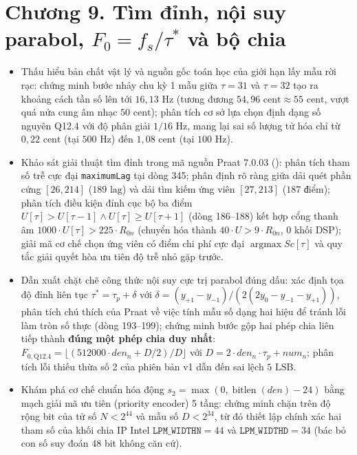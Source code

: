 \providecommand{\todo}[1]{\textcolor{red}{\textbf{[TODO: #1]}}}
\clearpage
{}
\section*{Chương 9. Tìm đỉnh, nội suy parabol, $F_0 = f_s/\tau^*$ và bộ chia}

\begin{learningobj}
\begin{itemize}[leftmargin=1.5em, itemsep=2pt]
    \item Thấu hiểu bản chất vật lý và nguồn gốc toán học của giới hạn lấy mẫu rời rạc: chứng minh bước nhảy chu kỳ 1 mẫu giữa $\tau = 31$ và $\tau = 32$ tạo ra khoảng cách tần số lên tới $16{,}13\text{ Hz}$ (tương đương $54{,}96\text{ cent} \approx 55\text{ cent}$, vượt quá nửa cung âm nhạc $50\text{ cent}$); phân tích cơ sở lựa chọn định dạng số nguyên Q12.4 với độ phân giải $1/16\text{ Hz}$, mang lại sai số lượng tử hóa chỉ từ $0{,}22\text{ cent}$ (tại $500\text{ Hz}$) đến $1{,}08\text{ cent}$ (tại $100\text{ Hz}$).
    \item Khảo sát giải thuật tìm đỉnh trong mã nguồn Praat 7.0.03 (): phân tích tham số trễ cực đại \texttt{maximumLag} tại dòng 345; phân định rõ ràng giữa dải quét phần cứng $[26, 214]$ ($189\text{ lag}$) và dải tìm kiếm ứng viên $[27, 213]$ ($187\text{ điểm}$); phân tích điều kiện đỉnh cục bộ ba điểm $U[\tau] > U[\tau-1] \land U[\tau] \ge U[\tau+1]$ (dòng 186--188) kết hợp cổng thanh âm $1000 \cdot U[\tau] > 225 \cdot R_{0n}$ (chuyển hóa thành $40 \cdot U > 9 \cdot R_{0n}$, 0 khối DSP); giải mã cơ chế chọn ứng viên có điểm chi phí cực đại $\operatorname{argmax} Sc[\tau]$ và quy tắc giải quyết hòa ưu tiên độ trễ nhỏ gặp trước.
    \item Dẫn xuất chặt chẽ công thức nội suy cực trị parabol đúng dấu: xác định tọa độ đỉnh liên tục $\tau^* = \tau_p + \delta$ với $\delta = (y_{+1} - y_{-1}) / (2(2y_0 - y_{-1} - y_{+1}))$, phân tích chú thích của Praat về việc tính mẫu số dạng hai hiệu để tránh lỗi làm tròn số thực (dòng 193--199); chứng minh bước gộp hai phép chia liên tiếp thành \textbf{đúng một phép chia duy nhất}: $F_{0, \text{Q12.4}} = \lfloor (512000 \cdot den_n + D/2) / D \rfloor$ với $D = 2 \cdot den_n \cdot \tau_p + num_n$; phân tích lỗi thiếu thừa số 2 của phiên bản v1 dẫn đến sai lệch $5\text{ LSB}$.
    \item Khám phá cơ chế chuẩn hóa động $s_2 = \max(0, \operatorname{bitlen}(den) - 24)$ bằng mạch giải mã ưu tiên (priority encoder) 5 tầng: chứng minh chặn trên độ rộng bit của tử số $N < 2^{44}$ và mẫu số $D < 2^{34}$, từ đó thiết lập chính xác hai tham số của khối chia IP Intel $\texttt{LPM\_WIDTHN} = 44$ và $\texttt{LPM\_WIDTHD} = 34$ (bác bỏ con số suy đoán 48 bit không căn cứ).

\end{itemize}
\end{learningobj}
